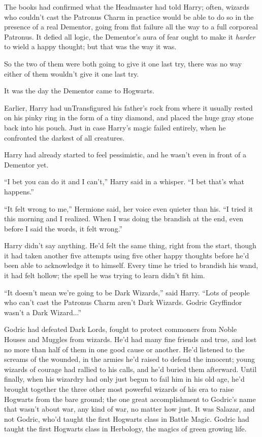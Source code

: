 The books had confirmed what the Headmaster had told Harry; often,
wizards who couldn't cast the Patronus Charm in practice would be able
to do so in the presence of a real Dementor, going from flat failure all
the way to a full corporeal Patronus. It defied all logic, the
Dementor's aura of fear ought to make it \emph{harder} to wield a happy
thought; but that was the way it was.

So the two of them were both going to give it one last try, there was no
way either of them wouldn't give it one last try.

It was the day the Dementor came to Hogwarts.

Earlier, Harry had unTransfigured his father's rock from where it
usually rested on his pinky ring in the form of a tiny diamond, and
placed the huge gray stone back into his pouch. Just in case Harry's
magic failed entirely, when he confronted the darkest of all creatures.

Harry had already started to feel pessimistic, and he wasn't even in
front of a Dementor yet.

``I bet you can do it and I can't,'' Harry said in a whisper. ``I bet
that's what happens.''

``It felt wrong to me,'' Hermione said, her voice even quieter than his.
``I tried it this morning and I realized. When I was doing the brandish
at the end, even before I said the words, it felt wrong.''

Harry didn't say anything. He'd felt the same thing, right from the
start, though it had taken another five attempts using five other happy
thoughts before he'd been able to acknowledge it to himself. Every time
he tried to brandish his wand, it had felt hollow; the spell he was
trying to learn didn't fit him.

``It doesn't mean we're going to be Dark Wizards,'' said Harry. ``Lots
of people who can't cast the Patronus Charm aren't Dark Wizards. Godric
Gryffindor wasn't a Dark Wizard...''

Godric had defeated Dark Lords, fought to protect commoners from Noble
Houses and Muggles from wizards. He'd had many fine friends and true,
and lost no more than half of them in one good cause or another. He'd
listened to the screams of the wounded, in the armies he'd raised to
defend the innocent; young wizards of courage had rallied to his calls,
and he'd buried them afterward. Until finally, when his wizardry had
only just begun to fail him in his old age, he'd brought together the
three other most powerful wizards of his era to raise Hogwarts from the
bare ground; the one great accomplishment to Godric's name that wasn't
about war, any kind of war, no matter how just. It was Salazar, and not
Godric, who'd taught the first Hogwarts class in Battle Magic. Godric
had taught the first Hogwarts class in Herbology, the magics of green
growing life.


